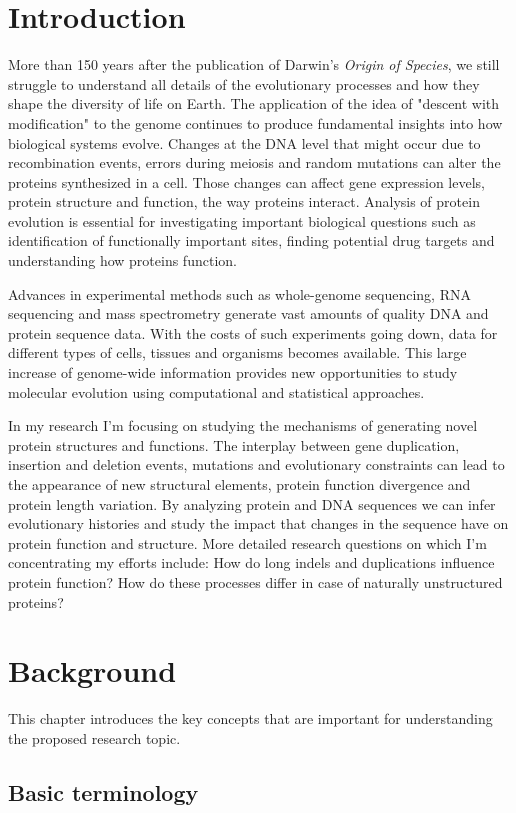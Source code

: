 \documentclass[11pt, a4paper,oneside]{report}
\newcommand{\mychapter}[2]{
    \setcounter{chapter}{#1}
    \setcounter{section}{0}
    \chapter*{#2}
    \addcontentsline{toc}{chapter}{#2}
}
\begin{document}
\mychapter{0}{Introduction}
More than 150 years after the publication of Darwin's {\itshape Origin of Species}, we still struggle to understand all details of the evolutionary processes and how they shape the diversity of life on Earth. The application of the idea of "descent with modification" to the genome continues to produce fundamental insights into how biological systems evolve. Changes at the DNA level that might occur due to recombination events, errors during meiosis and random mutations can alter the proteins synthesized in a cell. Those changes can affect gene expression levels, protein structure and function, the way proteins interact. Analysis of protein evolution is essential for investigating important biological questions such as identification of functionally important sites, finding potential drug targets and understanding how proteins function.
  
Advances in experimental methods such as whole-genome sequencing, RNA sequencing and mass spectrometry generate vast amounts of quality DNA and protein sequence data.  With the costs of such experiments going down, data for different types of cells, tissues and organisms becomes available. This large increase of genome-wide information provides new opportunities to study molecular evolution using computational and statistical approaches.

In my research I'm focusing on studying the mechanisms of generating novel protein structures and functions. The interplay between gene duplication, insertion and deletion events, mutations and evolutionary constraints can lead to the appearance of new structural elements,  
protein function divergence and protein length variation. By analyzing protein and DNA sequences we can infer evolutionary histories and study the impact that changes in the sequence have on protein function and structure.  More detailed research questions on which I'm concentrating my efforts include: How do long indels and duplications influence protein function? How do these processes differ in case of naturally unstructured proteins? 

\mychapter{1}{Background}

This chapter introduces the key concepts that are important for understanding the proposed research topic. 
\section{Basic terminology}
\end{document}
